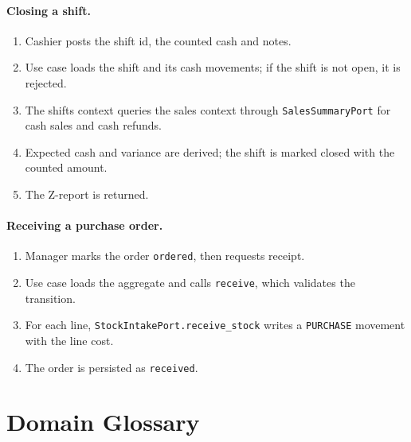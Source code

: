 \documentclass[11pt,a4paper]{article}
\begin{document}
\paragraph{Closing a shift.}
\begin{enumerate}[leftmargin=1.4em]
  \item Cashier posts the shift id, the counted cash and notes.
  \item Use case loads the shift and its cash movements; if the shift is not open, it is rejected.
  \item The shifts context queries the sales context through \texttt{SalesSummaryPort} for cash sales
  and cash refunds.
  \item Expected cash and variance are derived; the shift is marked closed with the counted amount.
  \item The Z-report is returned.
\end{enumerate}

\paragraph{Receiving a purchase order.}
\begin{enumerate}[leftmargin=1.4em]
  \item Manager marks the order \texttt{ordered}, then requests receipt.
  \item Use case loads the aggregate and calls \texttt{receive}, which validates the transition.
  \item For each line, \texttt{StockIntakePort.receive\_stock} writes a \texttt{PURCHASE} movement
  with the line cost.
  \item The order is persisted as \texttt{received}.
\end{enumerate}

\section{Domain Glossary}
\label{app:glossary}
\end{document}

